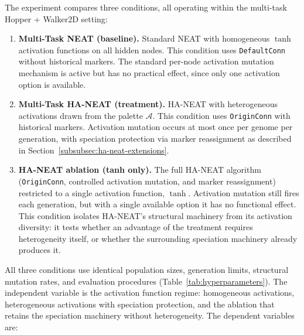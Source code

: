 \documentclass[12pt]{article}
\begin{document}
The experiment compares three conditions, all operating within the multi-task Hopper + Walker2D setting:

\begin{enumerate}
    \item \textbf{Multi-Task NEAT (baseline).} Standard NEAT with homogeneous $\tanh$ activation functions on all hidden nodes. This condition uses \texttt{DefaultConn} without historical markers. The standard per-node activation mutation mechanism is active but has no practical effect, since only one activation option is available.

    \item \textbf{Multi-Task HA-NEAT (treatment).} HA-NEAT with heterogeneous activations drawn from the palette $\mathcal{A}$. This condition uses \texttt{OriginConn} with historical markers. Activation mutation occurs at most once per genome per generation, with speciation protection via marker reassignment as described in Section~\ref{subsubsec:ha-neat-extensions}.

    \item \textbf{HA-NEAT ablation (tanh only).} The full HA-NEAT algorithm (\texttt{OriginConn}, controlled activation mutation, and marker reassignment) restricted to a single activation function, $\tanh$. Activation mutation still fires each generation, but with a single available option it has no functional effect. This condition isolates HA-NEAT's structural machinery from its activation diversity: it tests whether an advantage of the treatment requires heterogeneity itself, or whether the surrounding speciation machinery already produces it.
\end{enumerate}

All three conditions use identical population sizes, generation limits, structural mutation rates, and evaluation procedures (Table~\ref{tab:hyperparameters}).
The independent variable is the activation function regime: homogeneous activations, heterogeneous activations with speciation protection, and the ablation that retains the speciation machinery without heterogeneity.
The dependent variables are:
\end{document}

